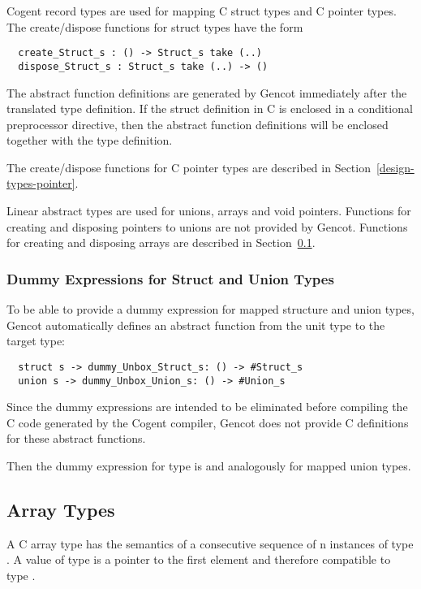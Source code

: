 Cogent record types are used for mapping C struct types and C pointer types. The create/dispose functions for
struct types have the form 
\begin{verbatim}
  create_Struct_s : () -> Struct_s take (..)
  dispose_Struct_s : Struct_s take (..) -> ()
\end{verbatim}
The abstract function definitions are generated by Gencot immediately after the translated type definition.
If the struct definition in C is enclosed in a conditional preprocessor directive, then the abstract
function definitions will be enclosed together with the type definition.

The create/dispose functions for C pointer types are described in Section~\ref{design-types-pointer}.

Linear abstract types are used for unions, arrays and void pointers. Functions for creating and disposing pointers
to unions are not provided by Gencot. Functions for creating and disposing arrays are described in 
Section~\ref{design-types-array}.

\subsubsection{Dummy Expressions for Struct and Union Types}

To be able to provide a dummy expression for mapped structure and union types, Gencot automatically defines an 
abstract function from the unit type to the target type:
\begin{verbatim}
  struct s -> dummy_Unbox_Struct_s: () -> #Struct_s
  union s -> dummy_Unbox_Union_s: () -> #Union_s
\end{verbatim}
Since the dummy expressions are intended to be eliminated before compiling the 
C code generated by the Cogent compiler, Gencot does not provide C definitions for these abstract functions. 

Then the dummy expression for type  is  and analogously
for mapped union types. 

\subsection{Array Types}
\label{design-types-array}

A C array type  has the semantics of a consecutive sequence of n instances of type . A value
of type  is a pointer to the first element and therefore compatible to type .

